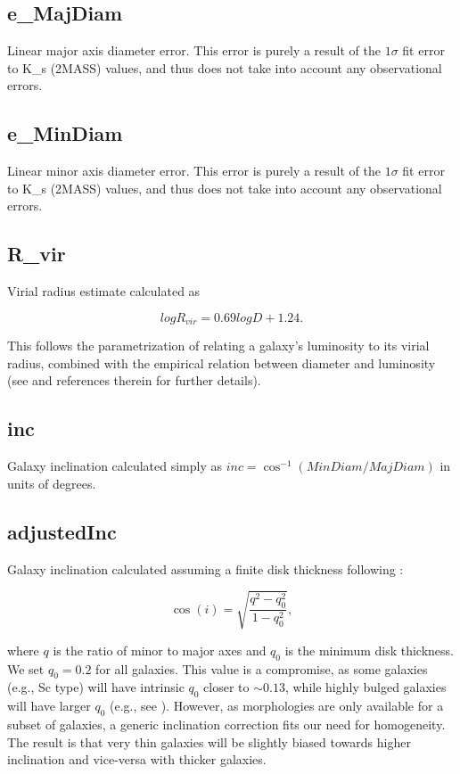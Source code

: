 \subsection{e\_MajDiam} \label{e_MajDiam}
Linear major axis diameter error. This error is purely a result of the $1\sigma$ fit error to K\_s (2MASS) values, and thus does not take into account any observational errors.

\subsection{e\_MinDiam} \label{e_MinDiam}
Linear minor axis diameter error. This error is purely a result of the $1\sigma$ fit error to K\_s (2MASS) values, and thus does not take into account any observational errors.

\subsection{R\_vir} \label{R_vir}
Virial radius estimate calculated as

\begin{equation}
log R_{vir} = 0.69 log D + 1.24.
\end{equation}

\noindent This follows the parametrization of \cite{stocke2013} relating a galaxy's luminosity to its virial radius, combined with the \cite{wakker2009} empirical relation between diameter and luminosity (see \citealt{wakker2015} and references therein for further details).

\subsection{inc} \label{inc}
Galaxy inclination calculated simply as $inc = \cos^{-1} (MinDiam / MajDiam)$ in units of degrees.

\subsection{adjustedInc} \label{adjustedInc}
Galaxy inclination calculated assuming a finite disk thickness following \cite{heidmann1972}:

\begin{equation}
	\cos(i) = \sqrt{\frac{q^2 - q_0^2}{1 - q_0^2}},
	\label{incEq}
\end{equation}

\noindent where $q$ is the ratio of minor to major axes and $q_0$ is the minimum disk thickness. We set $q_0 = 0.2$ for all galaxies. This value is a compromise, as some galaxies (e.g., Sc type) will have intrinsic $q_0$ closer to $\sim 0.13$, while highly bulged galaxies will have larger $q_0$ (e.g., see \citealt{heidmann1972c}). However, as morphologies are only available for a subset of galaxies, a generic inclination correction fits our need for homogeneity. The result is that very thin galaxies will be slightly biased towards higher inclination and vice-versa with thicker galaxies.

